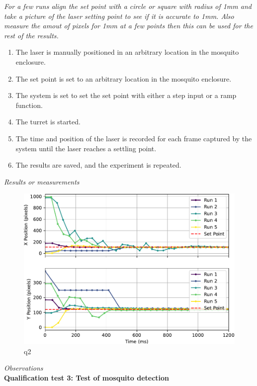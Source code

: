 \textit{For a few runs align the set point with a circle or square with radius of 1mm and take a picture of the laser setting point to see if it is accurate to 1mm. Also measure the amout of pixels for 1mm at a few points then this can be used for the rest of the results.}

\begin{enumerate}
  \item The laser is manually positioned in an arbitrary location in the mosquito enclosure.
  \item The set point is set to an arbitrary location in the mosquito enclosure.
  \item The system is set to set the set point with either a step input or a ramp function.
  \item The turret is started.
  \item The time and position of the laser is recorded for each frame captured by the system until the laser reaches a settling point.
  \item The results are saved, and the experiment is repeated.
\end{enumerate}

\textit{Results or measurements}\\
\begin{figure}[h]
  \centering
  \includegraphics[width=\textwidth]{figures/results/q2.pdf}
  \caption{q2}
  \label{fig:q2}
\end{figure}

\textit{Observations}\\

\textbf{Qualification test 3: Test of mosquito detection}\\

